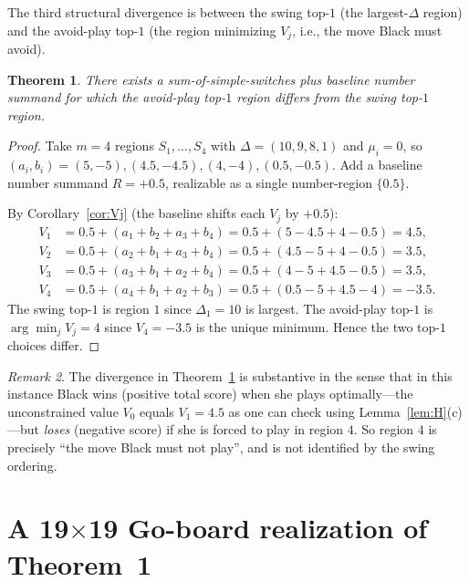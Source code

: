 \documentclass[11pt,a4paper]{amsart}
\newtheorem{theorem}{Theorem}[section]
\theoremstyle{definition}
\theoremstyle{remark}
\newtheorem{remark}[theorem]{Remark}
\begin{document}
The third structural divergence is between the swing top-$1$ (the
largest-$\Delta$ region) and the avoid-play top-$1$ (the region
minimizing $V_j$, i.e., the move Black must avoid).

\begin{theorem}\label{thm:F3}
There exists a sum-of-simple-switches plus baseline number summand for
which the avoid-play top-$1$ region differs from the swing top-$1$
region.
\end{theorem}

\begin{proof}
Take $m = 4$ regions $S_1, \ldots, S_4$ with $\Delta = (10, 9, 8, 1)$
and $\mu_i = 0$, so
$(a_i, b_i) = (5, -5), (4.5, -4.5), (4, -4), (0.5, -0.5)$. Add a
baseline number summand $R = +0.5$, realizable as a single
number-region $\{0.5\}$.

By Corollary~\ref{cor:Vj} (the baseline shifts each $V_j$ by $+0.5$):
\begin{align*}
  V_1 &= 0.5 + (a_1 + b_2 + a_3 + b_4)
       = 0.5 + (5 - 4.5 + 4 - 0.5) = 4.5,
  \\
  V_2 &= 0.5 + (a_2 + b_1 + a_3 + b_4)
       = 0.5 + (4.5 - 5 + 4 - 0.5) = 3.5,
  \\
  V_3 &= 0.5 + (a_3 + b_1 + a_2 + b_4)
       = 0.5 + (4 - 5 + 4.5 - 0.5) = 3.5,
  \\
  V_4 &= 0.5 + (a_4 + b_1 + a_2 + b_3)
       = 0.5 + (0.5 - 5 + 4.5 - 4) = -3.5.
\end{align*}
The swing top-$1$ is region $1$ since $\Delta_1 = 10$ is largest. The
avoid-play top-$1$ is $\arg\min_j V_j = 4$ since $V_4 = -3.5$ is the
unique minimum. Hence the two top-$1$ choices differ.
\end{proof}

\begin{remark}\label{rem:substantive}
The divergence in Theorem~\ref{thm:F3} is substantive in the sense that
in this instance Black wins (positive total score) when she plays
optimally---the unconstrained value $V_0$ equals $V_1 = 4.5$ as one can
check using Lemma~\ref{lem:H}(c)---but \emph{loses} (negative score) if
she is forced to play in region $4$. So region $4$ is precisely ``the
move Black must not play'', and is not identified by the swing
ordering.
\end{remark}

\section{A 19$\times$19 Go-board realization of Theorem~1}
\label{sec:realization}
\end{document}
